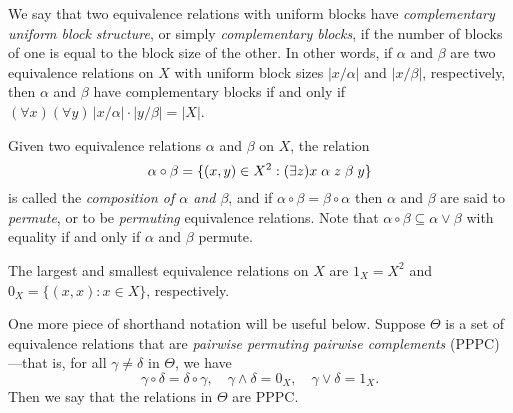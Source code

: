 \documentclass{amsart}
\theoremstyle{plain}
\theoremstyle{definition}
\theoremstyle{definition}
\numberwithin{equation}{section}
\newcommand{\<}{\ensuremath{\langle}}
\renewcommand{\>}{\ensuremath{\rangle}}
\newcommand{\Eq}{\ensuremath{\operatorname{Eq}}}
\newcommand{\rel}{\ensuremath{\mathrel}}
\newcommand{\meet}{\ensuremath{\wedge}}
\newcommand{\join}{\ensuremath{\vee}}
\begin{document}
We say that two equivalence relations with uniform
blocks  have 
\emph{complementary uniform block structure}, or simply \emph{complementary
  blocks}, if the number of blocks of one is equal to
the block size of the other. In other words, if $\alpha$ and $\beta$ are two
equivalence relations on $X$ with uniform block sizes $|x/\alpha|$ and
$|x/\beta|$, respectively, then $\alpha$ and $\beta$ have complementary blocks
if and only if $(\forall x)(\forall y)\, |x/\alpha|\cdot |y/\beta| = |X|$.


Given two equivalence relations $\alpha$ and $\beta$ on $X$, the relation
\[
\alpha \circ \beta = \{(x,y) \in X^2: (\exists z)x\rel{\alpha} z
\rel{\beta} y\}
\]
is called the \emph{composition of $\alpha$ and $\beta$}, and if 
$\alpha \circ \beta = \beta \circ \alpha$ then $\alpha$ and $\beta$ are said to
\emph{permute}, or to be \emph{permuting} equivalence relations.  
Note that $\alpha \circ \beta \subseteq \alpha \join \beta$ with equality if and
only if $\alpha$ and $\beta$ permute.

The largest and smallest equivalence relations on $X$ are $1_X = X^2$
and $0_X = \{(x,x) : x \in X\}$, respectively.

One more piece of shorthand notation will be useful below.  
Suppose $\Theta$ is a set of equivalence relations that are 
\emph{pairwise permuting pairwise complements} (\ac{PPPC})---that is, 
for all $\gamma \neq \delta$ in $\Theta$, we have
\[
\gamma \circ \delta = \delta \circ \gamma,  
\quad  \gamma \meet \delta = 0_X, 
\quad  \gamma \join \delta = 1_X.
\]
Then we say that the relations in $\Theta$ are \acs{PPPC}.
\end{document}
